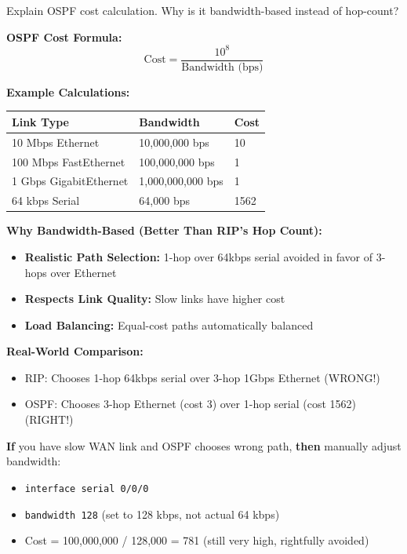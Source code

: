 \documentclass[12pt,a4paper]{article}
\begin{document}

\begin{qbox}{Explain OSPF cost calculation. Why is it bandwidth-based instead of hop-count?}
\end{qbox}

\begin{abox}
\textbf{OSPF Cost Formula:}
$$\text{Cost} = \frac{10^8}{\text{Bandwidth (bps)}}$$

\textbf{Example Calculations:}
\begin{center}
\begin{tabular}{lll}
\toprule
\textbf{Link Type} & \textbf{Bandwidth} & \textbf{Cost} \\
\midrule
10 Mbps Ethernet & 10,000,000 bps & 10 \\
100 Mbps FastEthernet & 100,000,000 bps & 1 \\
1 Gbps GigabitEthernet & 1,000,000,000 bps & 1 \\
64 kbps Serial & 64,000 bps & 1562 \\
\bottomrule
\end{tabular}
\end{center}

\textbf{Why Bandwidth-Based (Better Than RIP's Hop Count):}

\begin{itemize}
    \item \textbf{Realistic Path Selection:} 1-hop over 64kbps serial avoided in favor of 3-hops over Ethernet
    \item \textbf{Respects Link Quality:} Slow links have higher cost
    \item \textbf{Load Balancing:} Equal-cost paths automatically balanced
\end{itemize}

\textbf{Real-World Comparison:}
\begin{itemize}
    \item RIP: Chooses 1-hop 64kbps serial over 3-hop 1Gbps Ethernet (WRONG!)
    \item OSPF: Chooses 3-hop Ethernet (cost 3) over 1-hop serial (cost 1562) (RIGHT!)
\end{itemize}

\textbf{If} you have slow WAN link and OSPF chooses wrong path, \textbf{then} manually adjust bandwidth:
\begin{itemize}
    \item \texttt{interface serial 0/0/0}
    \item \texttt{bandwidth 128} (set to 128 kbps, not actual 64 kbps)
    \item Cost = 100,000,000 / 128,000 = 781 (still very high, rightfully avoided)
\end{itemize}
\end{abox}
\end{document}
